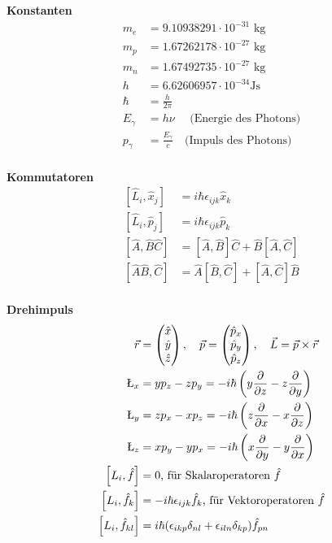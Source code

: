 \documentclass[landscape,8pt]{scrartcl}
\newcommand{\myheading}[1]{\textbf{#1}}
\begin{document}
\begin{multicols}{3}
\myheading{Konstanten}
\begin{align*}
m_e &= 9.10938291\cdot 10^{-31} \text{ kg} \\
m_p &= 1.67262178\cdot 10^{-27} \text{ kg} \\
m_n &= 1.67492735\cdot 10^{-27} \text{ kg} \\
h &= 6.62606957\cdot 10^{-34} \text{Js} \\
\hbar &= \frac{h}{2\pi} \\
E_\gamma &= h \nu \quad\text{ (Energie des Photons)} \\
p_\gamma &= \frac{E_\gamma}{c} \quad \text{(Impuls des Photons)}\\
\end{align*}

\myheading{Kommutatoren}
\begin{align*}
\left[\hat L_i,\hat x_j\right] &= i\hbar \epsilon_{ijk}\hat x_k	\\
\left[\hat L_i,\hat p_j\right] &= i\hbar \epsilon_{ijk}\hat p_k	\\
\left[\hat A, \hat B \hat C\right]&= \left[ \hat A, \hat B \right] \hat C+ \hat B\left[ \hat A, \hat C \right] \\
\left[\hat A\hat B, \hat C\right]&= \hat A \left[ \hat B, \hat C \right] + \left[ \hat A, \hat C \right] \hat B\\
\end{align*}

\myheading{Drehimpuls}
\begin{align*}
\vec r 	&= \begin{pmatrix}\hat x\\\hat y\\\hat z\end{pmatrix},
\quad \vec p 	= \begin{pmatrix}\hat p_x\\\hat p_y\\\hat p_z\end{pmatrix},
\quad \vec L = \vec p \times \vec r \\
%
\L_x 	&= yp_z - zp_y = -i\hbar \left( y\frac{\partial}{\partial z}-z\frac{\partial}{\partial y}\right) \\
%
\L_y 	&= zp_x - xp_z = -i\hbar \left( z\frac{\partial}{\partial x}-x\frac{\partial}{\partial z}\right) \\
%
\L_z 	&= xp_y - yp_x = -i\hbar \left( x\frac{\partial}{\partial y}-y\frac{\partial}{\partial x}\right)\\
\left[L_i,\hat f\right] &= 0 \text{, für Skalaroperatoren $\hat f$} \\
\left[L_i,\hat f_k\right] &= -i\hbar \epsilon_{ijk}\hat f_k \text{, für Vektoroperatoren $\hat f$} \\
\left[L_i,\hat f_{kl}\right] &= i\hbar (\epsilon_{ikp}\delta_{nl}+\epsilon_{iln}\delta_{kp})\hat f_{pn}
\end{align*}



\end{multicols}
\end{document}
